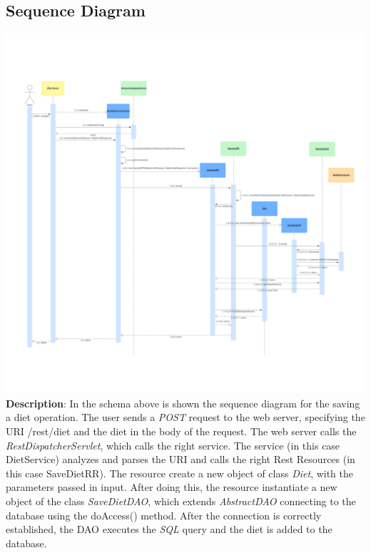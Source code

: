 \subsection{Sequence Diagram}
\includegraphics[scale=0.38]{Resources/SeqDiagPostDiet.pdf}
\textbf{Description}: 
In the schema above is shown the sequence diagram for the saving a diet operation.
The user sends a \textit{POST} request to the web server, specifying the URI /rest/diet and the diet in the body of the request. The web server calls the \textit{RestDispatcherServlet}, which calls the right service. The service (in this case DietService) analyzes and parses the URI and calls the right Rest Resources (in this case SaveDietRR). The resource create a new object of class \textit{Diet}, with the parameters passed in input.  After doing this, the resource instantiate a new object of the class \textit{SaveDietDAO}, which extends \textit{AbstractDAO} connecting to the database using the doAccess() method. After the connection is correctly established, the DAO executes the \textit{SQL} query and the diet is added to the database.
